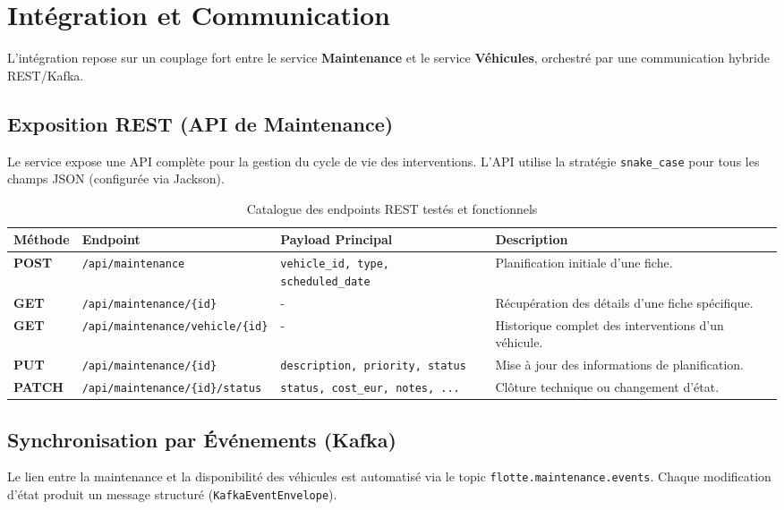 \documentclass[12pt,a4paper]{article}
\begin{document}
\section{Intégration et Communication}

L'intégration repose sur un couplage fort entre le service \textbf{Maintenance} et le service \textbf{Véhicules}, orchestré par une communication hybride REST/Kafka.

\subsection{Exposition REST (API de Maintenance)}
Le service expose une API complète pour la gestion du cycle de vie des interventions. L'API utilise la stratégie \texttt{snake\_case} pour tous les champs JSON (configurée via Jackson).

\begin{table}[H]
\centering
\small
\begin{tabular}{|l|l|l|p{6cm}|}
  \hline
  \rowcolor{primary!15}
  \textbf{Méthode} & \textbf{Endpoint} & \textbf{Payload Principal} & \textbf{Description} \\
  \hline
  \textbf{POST} & \texttt{/api/maintenance} & \texttt{vehicle\_id, type, scheduled\_date} & Planification initiale d'une fiche. \\
  \hline
  \textbf{GET} & \texttt{/api/maintenance/\{id\}} & - & Récupération des détails d'une fiche spécifique. \\
  \hline
  \textbf{GET} & \texttt{/api/maintenance/vehicle/\{id\}} & - & Historique complet des interventions d'un véhicule. \\
  \hline
  \textbf{PUT} & \texttt{/api/maintenance/\{id\}} & \texttt{description, priority, status} & Mise à jour des informations de planification. \\
  \hline
  \textbf{PATCH} & \texttt{/api/maintenance/\{id\}/status} & \texttt{status, cost\_eur, notes, ...} & Clôture technique ou changement d'état. \\
  \hline
\end{tabular}
\caption{Catalogue des endpoints REST testés et fonctionnels}
\end{table}

\subsection{Synchronisation par Événements (Kafka)}
Le lien entre la maintenance et la disponibilité des véhicules est automatisé via le topic \texttt{flotte.maintenance.events}. Chaque modification d'état produit un message structuré (\texttt{KafkaEventEnvelope}).
\end{document}
